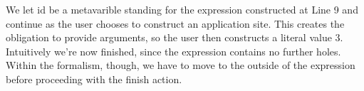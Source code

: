 \documentclass{llncs}
\begin{document}
We let $\textrm{id}$ be a metavarible standing for the expression
constructed at Line 9 and continue as the user chooses to construct an
application site. This creates the obligation to provide arguments, so the
user then constructs a literal value $3$. Intuitively we're now finished,
since the expression contains no further holes. Within the formalism,
though, we have to move to the outside of the expression before proceeding
with the finish action.


\end{document}
